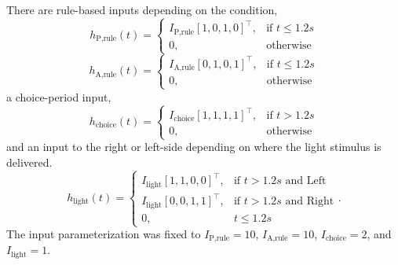 \documentclass[11pt]{article}
\begin{document}
There are rule-based inputs depending on the condition,
\begin{equation}h_{\text{P,rule}}(t) = \begin{cases}
                           I_{\text{P,rule}} [1, 0, 1, 0]^\top,& \text{if } t\leq 1.2s \\
                            0,              & \text{otherwise}
                         \end{cases}
\end{equation}
\begin{equation} h_{\text{A,rule}}(t) = \begin{cases}
                           I_{\text{A,rule}} [0, 1, 0, 1]^\top,& \text{if } t\leq 1.2s \\
                            0,              & \text{otherwise}
                         \end{cases}
\end{equation}
a choice-period input,
\begin{equation} h_{\text{choice}}(t) = \begin{cases}
                           I_{\text{choice}} [1, 1, 1, 1]^\top,& \text{if } t > 1.2s \\
                            0,              & \text{otherwise}
                         \end{cases}
\end{equation}
and an input to the right or left-side depending on where the light stimulus is delivered.     
\begin{equation}  h_{\text{light}}(t) = \begin{cases}
                           I_{\text{light}} [1, 1, 0, 0]^\top,& \text{if } t > 1.2s \text{ and Left} \\
                           I_{\text{light}} [0, 0, 1, 1]^\top,& \text{if } t > 1.2s \text{ and Right} \\
                            0,              & t \leq 1.2s
                         \end{cases} .
\end{equation}
The input parameterization was fixed to $I_{\text{P,rule}} = 10 $,  $I_{\text{A,rule}} = 10$,  $I_{\text{choice}} = 2$,  and $I_{\text{light}} = 1$.
\end{document}
